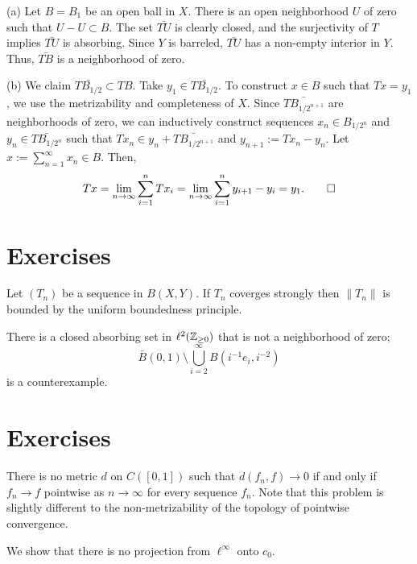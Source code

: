 \documentclass{../note}
\begin{document}
\begin{pf}
(a)
Let $B=B_1$ be an open ball in $X$.
There is an open neighborhood $U$ of zero such that $U-U\subset B$.
The set $\bar{TU}$ is clearly closed, and the surjectivity of $T$ implies $\bar{TU}$ is absorbing.
Since $Y$ is barreled, $\bar{TU}$ has a non-empty interior in $Y$.
Thus, $\bar{TB}$ is a neighborhood of zero.

(b)
We claim $\bar{TB_{1/2}}\subset TB$.
Take $y_1\in\bar{TB_{1/2}}$.
To construct $x\in B$ such that $Tx=y_1$, we use the metrizability and completeness of $X$.
Since $\bar{TB_{1/2^{n+1}}}$ are neighborhoods of zero, we can inductively construct sequences $x_n\in B_{1/2^n}$ and $y_n\in\bar{TB_{1/2^n}}$ such that $Tx_n\in y_n+\bar{TB_{1/2^{n+1}}}$ and $y_{n+1}:=Tx_n-y_n$.
Let $x:=\sum_{n=1}^\infty x_n\in B$.
Then,
\[Tx=\lim_{n\to\infty}\sum_{i=1}^nTx_i=\lim_{n\to\infty}\sum_{i=1}^ny_{i+1}-y_i=y_1.\qedhere\]
\end{pf}


\section*{Exercises}

\begin{prb}
Let $(T_n)$ be a sequence in $B(X,Y)$.
If $T_n$ coverges strongly then $\|T_n\|$ is bounded by the uniform boundedness principle.
\end{prb}

\begin{prb}
There is a closed absorbing set in $\ell^2(\mathbb{Z}_{\ge0})$ that is not a neighborhood of zero;
\[\bar B(0,1)\setminus\bigcup_{i=2}^\infty B(i^{-1}e_i,i^{-2})\]
is a counterexample.
\end{prb}




\section*{Exercises}
\begin{prb}
There is no metric $d$ on $C([0,1])$ such that $d(f_n,f)\to0$ if and only if $f_n\to f$ pointwise as $n\to\infty$ for every sequence $f_n$.
Note that this problem is slightly different to the non-metrizability of the topology of pointwise convergence.
\end{prb}

\begin{prb}
We show that there is no projection from $\ell^\infty$ onto $c_0$.
\end{prb}
\end{document}
